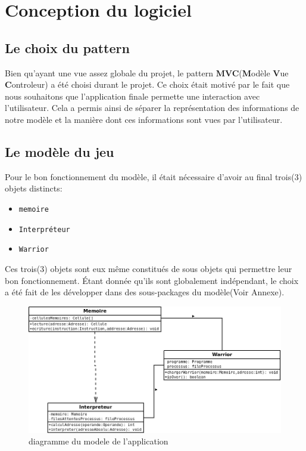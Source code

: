\documentclass[12pt]{article}
\newcommand{\classname}[1]{\texttt{#1}}
\begin{document}
\section{Conception du logiciel}
\subsection{Le choix du pattern}
Bien qu'ayant une vue assez globale du projet, le pattern \textbf{MVC}(\textbf{M}odèle \textbf{V}ue \textbf{C}ontroleur) a été choisi durant le projet. Ce choix était motivé par le fait que nous souhaitons que l'application finale permette une interaction avec l'utilisateur. Cela a permis ainsi de séparer la représentation des informations de notre modèle et la manière dont ces informations sont vues par l'utilisateur.
\subsection{Le modèle du jeu}
Pour le bon fonctionnement du modèle, il était nécessaire d'avoir au final trois(3) objets distincts:
\begin{itemize}
	\item \classname{memoire}
	\item \classname{Interpréteur}
	\item \classname{Warrior}
\end{itemize}
Ces trois(3) objets sont eux même constitués de sous objets qui permettre leur bon fonctionnement. Étant donnée qu'ils sont globalement indépendant, le choix a été fait de les développer dans des sous-packages du modèle(Voir Annexe).\\
\begin{figure}[h]
	\includegraphics[scale=0.5]{Images/diagrammeModele.png}
	\caption{diagramme du modele de l'application}
\end{figure}
\end{document}
